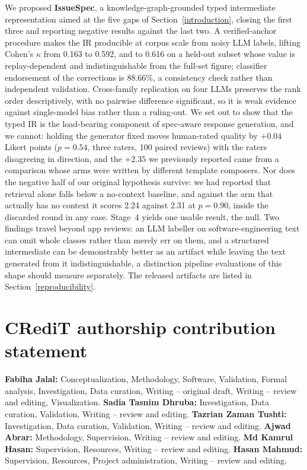 \documentclass[preprint,12pt]{elsarticle}
\begin{document}
  We proposed \textbf{IssueSpec}, a knowledge-graph-grounded typed intermediate representation
  aimed at the five gaps of Section~\ref{introduction}, closing the first three and reporting
  negative results against the last two. A verified-anchor procedure makes the IR producible at
  corpus scale from noisy LLM labels, lifting Cohen's $\kappa$ from 0.163 to 0.592, and to 0.616
  on a held-out subset whose value is replay-dependent and indistinguishable from the full-set
  figure; classifier endorsement of the corrections is 88.66\%, a consistency check rather than
  independent validation. Cross-family replication on four LLMs preserves the rank order
  descriptively, with no pairwise difference significant, so it is weak evidence against
  single-model bias rather than a ruling-out. We set out to show that the typed IR is the
  load-bearing component of spec-aware response generation, and we cannot: holding the generator
  fixed moves human-rated quality by $+0.04$ Likert points ($p = 0.54$, three raters, 100 paired
  reviews) with the raters disagreeing in direction, and the $+2.35$ we previously reported came
  from a comparison whose arms were written by different template composers. Nor does the negative
  half of our original hypothesis survive: we had reported that retrieval alone falls below a
  no-context baseline, and against the arm that actually has no context it scores 2.24 against
  2.31 at $p = 0.90$, inside the discarded round in any case. Stage~4 yields one usable result,
  the null. Two findings travel beyond app reviews: an LLM
  labeller on software-engineering text can omit whole classes rather than merely err on them, and
  a structured intermediate can be demonstrably better as an artifact while leaving the text
  generated from it indistinguishable, a distinction pipeline evaluations of this shape should
  measure separately. The released artifacts are listed in Section~\ref{reproducibility}.

\section*{CRediT authorship contribution statement}
\textbf{Fabiha Jalal:} Conceptualization, Methodology, Software, Validation, Formal analysis,
Investigation, Data curation, Writing -- original draft, Writing -- review and editing,
Visualization. \textbf{Sadia Tasnim Dhruba:} Investigation, Data curation, Validation, Writing
-- review and editing. \textbf{Tazrian Zaman Tushti:} Investigation, Data curation, Validation,
Writing -- review and editing. \textbf{Ajwad Abrar:} Methodology, Supervision, Writing --
review and editing. \textbf{Md Kamrul Hasan:} Supervision, Resources, Writing -- review and
editing. \textbf{Hasan Mahmud:} Supervision, Resources, Project administration, Writing --
review and editing.
\end{document}
